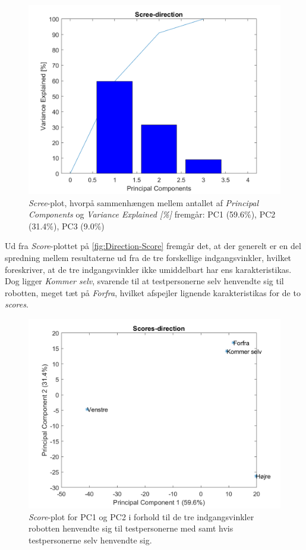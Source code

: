 \begin{figure}[H]
\centering
\includegraphics[width=\textwidth]{Figure/DatabehandlingSkalaer/PCAfigures/Direction-Scree.png}
\caption{\textit{Scree}-plot, hvorpå sammenhængen mellem antallet af \textit{Principal Components} og \textit{Variance Explained [\%]} fremgår: PC1 (59.6\%), PC2 (31.4\%), PC3 (9.0\%)}
\label{fig:Direction-Scree}
\end{figure}
\noindent
% 
Ud fra \textit{Score}-plottet på \autoref{fig:Direction-Score} fremgår det, at der generelt er en del spredning mellem resultaterne ud fra de tre forskellige indgangsvinkler, hvilket foreskriver, at de tre indgangsvinkler ikke umiddelbart har ens karakteristikas. Dog ligger \textit{Kommer selv}, svarende til at testpersonerne selv henvendte sig til robotten, meget tæt på \textit{Forfra}, hvilket afspejler lignende karakteristikas for de to \textit{scores}. 
%
\begin{figure}[H]
\centering
\includegraphics[width=\textwidth]{Figure/DatabehandlingSkalaer/PCAfigures/Direction-Scores}
\caption{\textit{Score}-plot for PC1 og PC2 i forhold til de tre indgangsvinkler robotten henvendte sig til testpersonerne med samt hvis testpersonerne selv henvendte sig.}
\label{fig:Direction-Score}
\end{figure}
